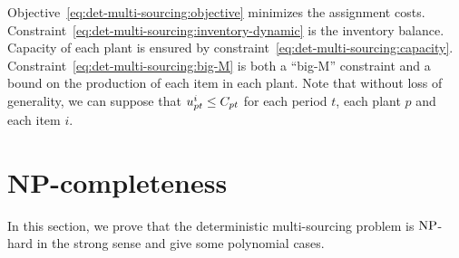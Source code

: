 Objective~\eqref{eq:det-multi-sourcing:objective} minimizes the assignment costs.
Constraint~\eqref{eq:det-multi-sourcing:inventory-dynamic} is the inventory balance.
Capacity of each plant is ensured by constraint~\eqref{eq:det-multi-sourcing:capacity}.
Constraint~\eqref{eq:det-multi-sourcing:big-M} is both a ``big-M'' constraint and a bound on the production of each item in each plant.
Note that without loss of generality, we can suppose that $u_{pt}^i \le C_{pt}$ for each period $t$, each plant $p$ and each item $i$.







\section{NP-completeness}
\label{sec:multi-sourcing:deterministic:NP-completeness}


In this section, we prove that the deterministic multi-sourcing problem is $\operatorname{NP}$-hard in the strong sense and give some polynomial cases.


